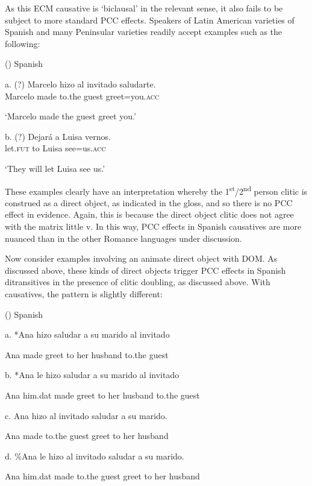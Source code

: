 \documentclass[output=paper,modfonts,nonflat]{langsci/langscibook}
\begin{document}
  As this ECM causative is ‘biclausal’ in the relevant sense, it also fails to be subject to more standard PCC effects. Speakers of Latin American varieties of Spanish and many Peninsular varieties readily accept examples such as the following:

()  Spanish

a. (?)   Marcelo   hizo   al   invitado  saludarte.\\
    Marcelo   made  to.the   guest   greet=you.\textsc{acc}

    \textsc{‘}Marcelo made the guest greet you.’

b. (?) Dejará   a   Luisa   vernos.\\
      let.\textsc{fut}   to   Luisa   see=us.\textsc{acc}

  ‘They will let Luisa see us.’

These examples clearly have an interpretation whereby the 1\textsuperscript{st}/2\textsuperscript{nd} person clitic is construed as a direct object, as indicated in the gloss, and so there is no PCC effect in evidence. Again, this is because the direct object clitic does not agree with the matrix little v. In this way, PCC effects in Spanish causatives are more nuanced than in the other Romance languages under discussion. 

Now consider examples involving an animate direct object with DOM. As discussed above, these kinds of direct objects trigger PCC effects in Spanish ditransitives in the presence of clitic doubling, as discussed above. With causatives, the pattern is slightly different:

()  Spanish

  a.   *Ana   hizo   saludar   a   su   marido   al    invitado

    Ana   made   greet   to   her   husband  to.the   guest  

  b.   *Ana   le   hizo   saludar   a   su   marido   al   invitado

  Ana   him.dat   made   greet   to   her husband to.the   guest

c.   Ana   hizo     al     invitado   saludar   a   su   marido.

  Ana   made   to.the   guest   greet   to   her   husband

d.   \%Ana le   hizo   al   invitado saludar   a     su   marido.

  Ana   him.dat   made   to.the   guest   greet   to   her   husband
\end{document}
